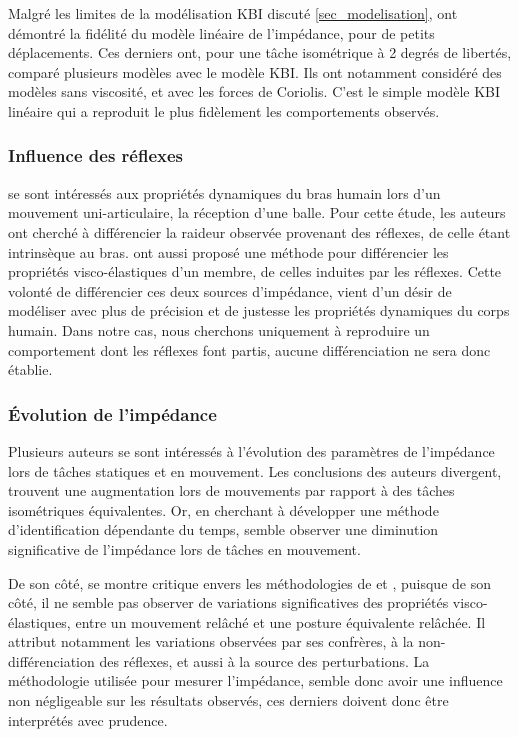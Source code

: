 \documentclass[12pt, a4paper]{article} %
\begin{document}
Malgré les limites de la modélisation KBI discuté \cref{sec_modelisation}, \cite{dolan_dynamic_1993} ont démontré la fidélité du modèle linéaire de l'impédance, pour de petits déplacements. Ces derniers ont, pour une tâche isométrique à 2 degrés de libertés, comparé plusieurs modèles avec le modèle KBI. Ils ont notamment considéré des modèles sans viscosité, et avec les forces de Coriolis. C'est le simple modèle KBI linéaire qui a reproduit le plus fidèlement les comportements observés. 

\subsubsection{Influence des réflexes}
\cite{bennett_catching_1994} se sont intéressés aux propriétés dynamiques du bras humain lors d'un mouvement uni-articulaire, la réception d'une balle. Pour cette étude, les auteurs ont cherché à différencier la raideur observée provenant des réflexes, de celle étant intrinsèque au bras. \cite{ludvig_voluntary_2007} ont aussi proposé une méthode pour différencier les propriétés visco-élastiques d'un membre, de celles induites par les réflexes. Cette volonté de différencier ces deux sources d'impédance, vient d'un désir de modéliser avec plus de précision et de justesse les propriétés dynamiques du corps humain. Dans notre cas, nous cherchons uniquement à reproduire un comportement dont les réflexes font partis, aucune différenciation ne sera donc établie.

\subsubsection{Évolution de l'impédance}
Plusieurs auteurs 
se sont intéressés à l'évolution des paramètres de l'impédance lors de tâches statiques et en mouvement. Les conclusions des auteurs divergent, \cite{gomi_human_1997, ludvig_mechanisms_2017} trouvent une augmentation lors de mouvements par rapport à des tâches isométriques équivalentes. Or, en cherchant à développer une méthode d'identification dépendante du temps, \cite{bennett_time-varying_1992} semble observer une diminution significative de l'impédance lors de tâches en mouvement. 

De son côté, \cite{popescu_elbow_2003} se montre critique envers les méthodologies de \cite{bennett_time-varying_1992} et \cite{gomi_human_1997}, puisque de son côté, il ne semble pas observer de variations significatives des propriétés visco-élastiques, entre un mouvement relâché et une posture équivalente relâchée. Il attribut notamment les variations observées par ses confrères, à la non-différenciation des réflexes, et aussi à la source des perturbations. La méthodologie utilisée pour mesurer l'impédance, semble donc avoir une influence non négligeable sur les résultats observés, ces derniers doivent donc être interprétés avec prudence. 
\end{document}
